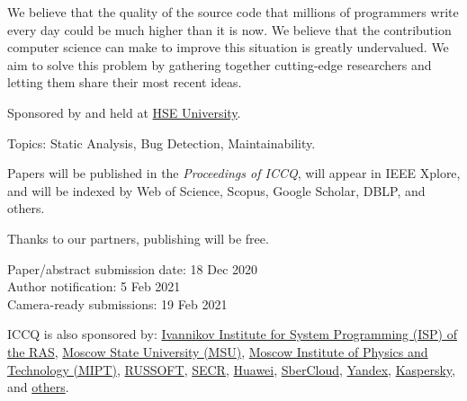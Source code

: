 \documentclass[12pt,oneside]{article}
\begin{document}
\vspace{6pt}

We believe that the quality of the source code that millions of programmers
write every day could be much higher than it is now. We believe that the
contribution computer science can make to improve this situation is greatly
undervalued. We aim to solve this problem by gathering
together cutting-edge researchers and letting them share their most recent ideas.

Sponsored by and held at \href{https://www.hse.ru/en/}{HSE University}.



Topics: Static Analysis, Bug Detection, Maintainability.

Papers will be published in the \textit{Proceedings of ICCQ},
will appear in IEEE Xplore\textsuperscript{\textregistered},
and will be indexed by Web of Science, Scopus, Google Scholar, DBLP, and others.

Thanks to our partners, publishing will be free.

\vspace{6pt}

Paper/abstract submission date: 18 Dec 2020 \\
Author notification: 5 Feb 2021 \\
Camera-ready submissions: 19 Feb 2021

\vspace{6pt}

\begin{adjustwidth}{0pt}{1in}
ICCQ is also sponsored by:
\href{https://www.ispras.ru/en/}{Ivannikov Institute for System Programming (ISP) of the RAS},
\href{https://www.msu.ru/}{Moscow State University (MSU)},
\href{https://mipt.ru/english/}{Moscow Institute of Physics and Technology (MIPT)},
\href{https://russoft.org/en/}{RUSSOFT},
\href{https://2021.secrus.org/?lang=en}{SECR},
\href{https://www.huawei.com}{Huawei},
\href{https://sbercloud.ru/}{SberCloud},
\href{https://yandex.ru/}{Yandex},
\href{https://www.kaspersky.com/}{Kaspersky},
and \href{https://www.iccq.ru/#partners}{others}.
\end{adjustwidth}
\end{document}
